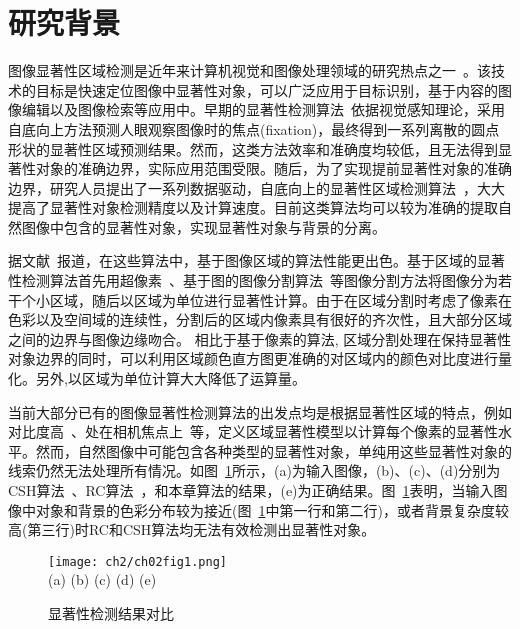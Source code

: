 \section{研究背景}
\label{sec:background}
图像显著性区域检测是近年来计算机视觉和图像处理领域的研究热点之一~\cite{saliencySurvey}。该技术的目标是快速定位图像中显著性对象，可以广泛应用于目标识别，基于内容的图像编辑以及图像检索等应用中。早期的显著性检测算法~\cite{itti}依据视觉感知理论，采用自底向上方法预测人眼观察图像时的焦点(fixation)，最终得到一系列离散的圆点形状的显著性区域预测结果。然而，这类方法效率和准确度均较低，且无法得到显著性对象的准确边界，实际应用范围受限。随后，为了实现提前显著性对象的准确边界，研究人员提出了一系列数据驱动，自底向上的显著性区域检测算法~\cite{Achanta08,ChengPAMI,ufo,Yan2014Hierarchical}，大大提高了显著性对象检测精度以及计算速度。目前这类算法均可以较为准确的提取自然图像中包含的显著性对象，实现显著性对象与背景的分离。\par
据文献~报道，在这些算法中，基于图像区域的算法性能更出色。基于区域的显著性检测算法首先用超像素~\cite{SLIC}、基于图的图像分割算法~\cite{graphseg}等图像分割方法将图像分为若干个小区域，随后以区域为单位进行显著性计算。由于在区域分割时考虑了像素在色彩以及空间域的连续性，分割后的区域内像素具有很好的齐次性，且大部分区域之间的边界与图像边缘吻合。 相比于基于像素的算法, 区域分割处理在保持显著性对象边界的同时，可以利用区域颜色直方图更准确的对区域内的颜色对比度进行量化。另外,以区域为单位计算大大降低了运算量。\par
当前大部分已有的图像显著性检测算法的出发点均是根据显著性区域的特点，例如对比度高~\cite{ChengPAMI}、处在相机焦点上~\cite{ufo}等，定义区域显著性模型以计算每个像素的显著性水平。然而，自然图像中可能包含各种类型的显著性对象，单纯用这些显著性对象的线索仍然无法处理所有情况。如图~\ref{fig:saliencyCom}所示，(a)为输入图像，(b)、(c)、(d)分别为CSH算法~\cite{Yan2014Hierarchical}、RC算法~\cite{ChengPAMI}，和本章算法的结果，(e)为正确结果。图~\ref{fig:saliencyCom}表明，当输入图像中对象和背景的色彩分布较为接近(图~\ref{fig:saliencyCom}中第一行和第二行)，或者背景复杂度较高(第三行)时RC和CSH算法均无法有效检测出显著性对象。
\begin{figure}[htb]
  \centering%
      {\texttt{[image: ch2/ch02fig1.png]}}\\
(a)\quad\quad\quad\quad\quad
(b)\quad\quad\quad\quad\quad\quad
(c)\quad\quad\quad\quad\quad\quad
(d)\quad\quad\quad\quad\quad
(e)
  \caption{显著性检测结果对比}
  \label{fig:saliencyCom}
\end{figure}

